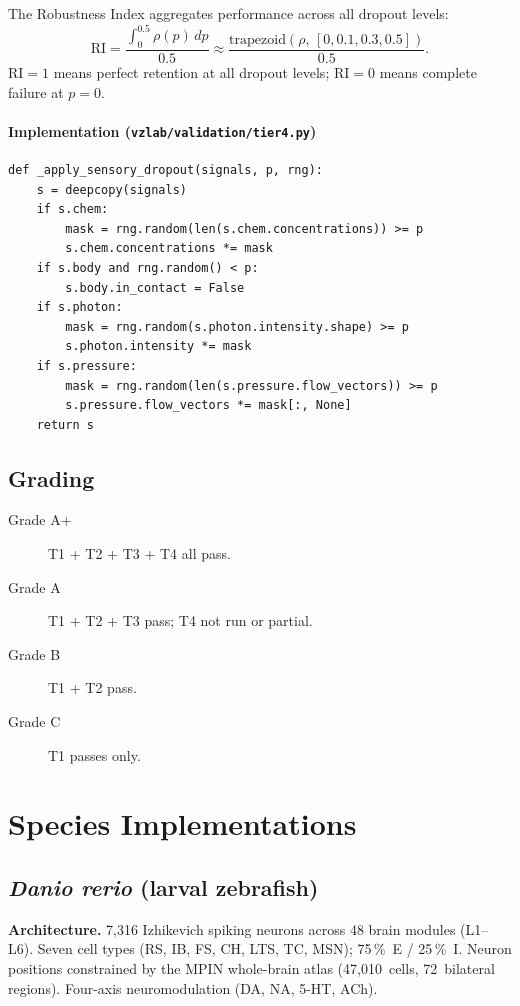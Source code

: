 \documentclass[11pt,a4paper]{article}
\begin{document}
The Robustness Index aggregates performance across all dropout levels:
\[
  \text{RI} = \frac{\displaystyle\int_0^{0.5} \rho(p)\,dp}{0.5}
  \approx \frac{\text{trapezoid}(\rho,\, [0,0.1,0.3,0.5])}{0.5}.
\]
$\text{RI} = 1$ means perfect retention at all dropout levels;
$\text{RI} = 0$ means complete failure at $p = 0$.

\paragraph{Implementation (\texttt{vzlab/validation/tier4.py})}

\begin{lstlisting}
def _apply_sensory_dropout(signals, p, rng):
    s = deepcopy(signals)
    if s.chem:
        mask = rng.random(len(s.chem.concentrations)) >= p
        s.chem.concentrations *= mask
    if s.body and rng.random() < p:
        s.body.in_contact = False
    if s.photon:
        mask = rng.random(s.photon.intensity.shape) >= p
        s.photon.intensity *= mask
    if s.pressure:
        mask = rng.random(len(s.pressure.flow_vectors)) >= p
        s.pressure.flow_vectors *= mask[:, None]
    return s
\end{lstlisting}

\subsection{Grading}

\begin{description}
  \item[Grade A+] T1 + T2 + T3 + T4 all pass.
  \item[Grade A]  T1 + T2 + T3 pass; T4 not run or partial.
  \item[Grade B]  T1 + T2 pass.
  \item[Grade C]  T1 passes only.
\end{description}

\section{Species Implementations}

\subsection{\textit{Danio rerio} (larval zebrafish)}

\textbf{Architecture.}
7,316 Izhikevich spiking neurons across 48 brain modules (L1--L6).
Seven cell types (RS, IB, FS, CH, LTS, TC, MSN); 75\,\%~E / 25\,\%~I.
Neuron positions constrained by the MPIN whole-brain atlas
(47,010~cells, 72~bilateral regions).
Four-axis neuromodulation (DA, NA, 5-HT, ACh).
\end{document}
